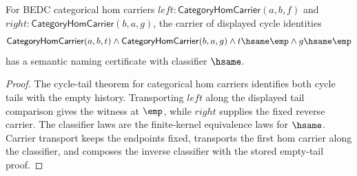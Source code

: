 \begin{theorem}
\label{thm:equivcat-cycle-identity-carrier-semantic-namecert}
For BEDC categorical hom carriers
$left:\mathsf{CategoryHomCarrier}(a,b,f)$ and
$right:\mathsf{CategoryHomCarrier}(b,a,g)$, the carrier of displayed cycle
identities
$$
\mathsf{CategoryHomCarrier}(a,b,t)\wedge
\mathsf{CategoryHomCarrier}(b,a,g)\wedge
t\hsame\emp\wedge g\hsame\emp
$$
has a semantic naming certificate with classifier $\hsame$.
\end{theorem}
\begin{proof}
The cycle-tail theorem for categorical hom carriers identifies both cycle
tails with the empty history. Transporting $left$ along the displayed tail
comparison gives the witness at $\emp$, while $right$ supplies the fixed
reverse carrier. The classifier laws are the finite-kernel equivalence laws
for $\hsame$. Carrier transport keeps the endpoints fixed, transports the
first hom carrier along the classifier, and composes the inverse classifier
with the stored empty-tail proof.
\end{proof}

